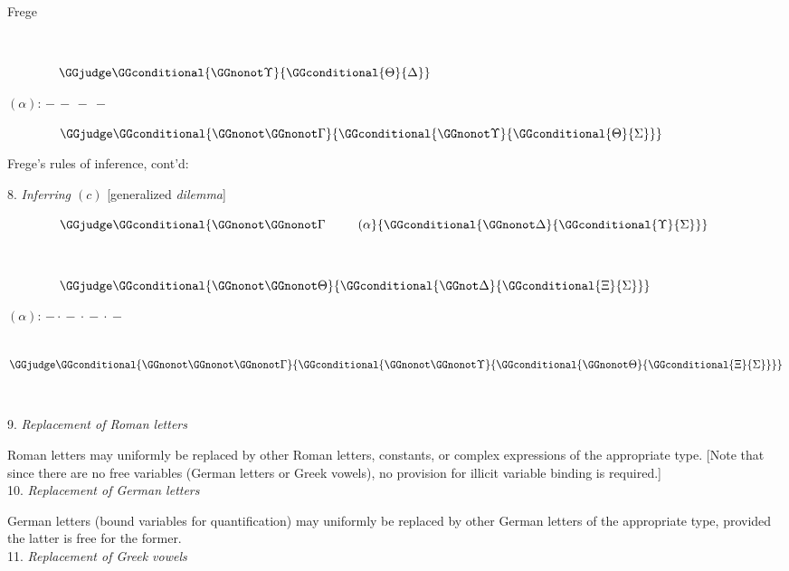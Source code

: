 \begin{entry}{Frege}
\begin{calculus}
\begin{minipage}[t]{.48\textwidth}
~

~~~~~~~~$\GGjudge\GGconditional{\GGnonot\Upsilon}{\GGconditional{\Theta}{\Delta}}$

$(\alpha)$: $-\,-\,-\ -$

~~~~~~~~$\GGjudge\GGconditional{\GGnonot\GGnonot\Gamma}{\GGconditional{\GGnonot\Upsilon}{\GGconditional{\Theta}{\Sigma}}}$
\end{minipage}
\end{calculus}


\begin{calculus}

Frege's rules of inference, cont'd:\\[-1ex]

\begin{minipage}[t]{.48\textwidth}
8. \emph{Inferring $(c)$} [generalized \emph{dilemma}]

~~~~~~~~$\GGjudge\GGconditional{\GGnonot\GGnonot\Gamma\hspace{6ex}(\alpha}{\GGconditional{\GGnonot\Delta}{\GGconditional{\Upsilon}{\Sigma}}}$

~

~~~~~~~~$\GGjudge\GGconditional{\GGnonot\GGnonot\Theta}{\GGconditional{\GGnot\Delta}{\GGconditional{\Xi}{\Sigma}}}$

$(\alpha)$: $-\!\cdot\!-\!\cdot\!-\!\cdot\!-$

~~~~~~~~$\GGjudge\GGconditional{\GGnonot\GGnonot\GGnonot\Gamma}{\GGconditional{\GGnonot\GGnonot\Upsilon}{\GGconditional{\GGnonot\Theta}{\GGconditional{\Xi}{\Sigma}}}}$





\end{minipage} ~~~~ 
\begin{minipage}[t]{.48\textwidth}

9. \emph{Replacement of Roman letters}

Roman letters may uniformly be replaced by other Roman letters, constants, or complex expressions of the appropriate type.
[Note that since there are no free variables (German letters or Greek vowels), no provision for illicit variable binding is required.]\\[1ex]
10. \emph{Replacement of German letters}

German letters (bound variables for quantification) may uniformly be replaced by other German letters of the appropriate type, provided the latter is free for the former.\\[1ex]
11. \emph{Replacement of Greek vowels}


\end{minipage}
\end{calculus}
\end{entry}
